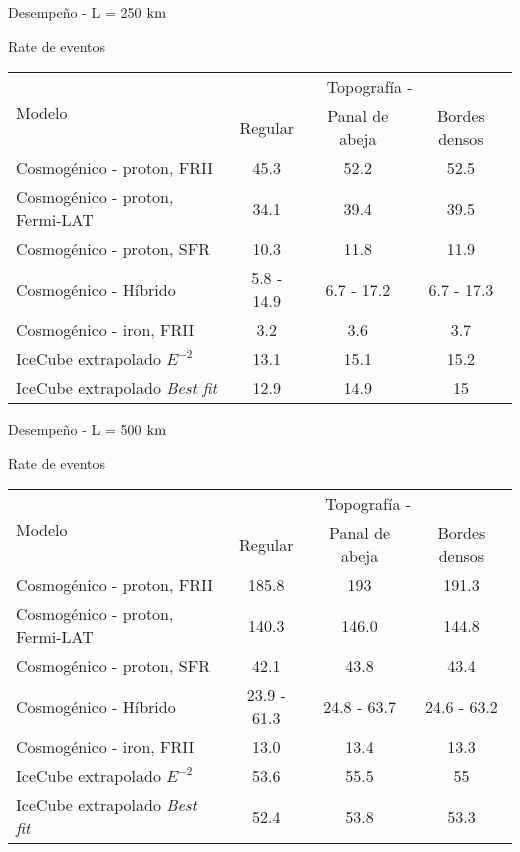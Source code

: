 \begin{frame}{Desempe\~no - L = 250 ${\rm km}$}
	\begin{block}{Rate de eventos}
		\begin{center}
		\renewcommand{\arraystretch}{1.3}
		\footnotesize
		\begin{tabular}{lccc}
			\hline
			\multirow{2}{*}{Modelo} & \multicolumn{3}{c}{Topograf\'ia - \cant{L=250}{km}} \\
			&   Regular &   Panal de abeja &   Bordes densos \\
			\hline
			Cosmogénico - proton, FRII &    45.3 &             52.2 &            52.5 \\
			Cosmogénico - proton, Fermi-LAT &     34.1 &             39.4 &            39.5 \\
			Cosmogénico - proton, SFR &     10.3 &             11.8 &            11.9 \\
			Cosmogénico - H\'ibrido &      5.8 - 14.9 &      6.7 - 17.2 &       6.7 - 17.3 \\
			Cosmogénico - iron, FRII &     3.2 &              3.6 &             3.7 \\
			IceCube extrapolado $E^{-2}$ &      13.1 &             15.1 &            15.2 \\
			IceCube extrapolado \emph{Best fit}  &      12.9 &             14.9 &            15   \\
			\hline
		\end{tabular}
		\end{center}
	\end{block}
\end{frame}

\begin{frame}{Desempe\~no - L = 500 ${\rm km}$}
	\begin{block}{Rate de eventos}
		\begin{center}
		\renewcommand{\arraystretch}{1.3}
		\footnotesize
		\begin{tabular}{lccc}
			\hline
			\multirow{2}{*}{Modelo} & \multicolumn{3}{c}{Topograf\'ia - \cant{L=500}{km}} \\
			&   Regular &   Panal de abeja &   Bordes densos \\
			\hline
			Cosmogénico - proton, FRII &    185.8 &            193   &           191.3 \\
			Cosmogénico - proton, Fermi-LAT &     140.3 &             146.0 &           144.8 \\
			Cosmogénico - proton, SFR &     42.1 &             43.8   &            43.4 \\
			Cosmogénico - H\'ibrido &  23.9 - 61.3 &   24.8 - 63.7 &  24.6 - 63.2 \\
			Cosmogénico - iron, FRII &     13.0   &        13.4 &            13.3 \\
			IceCube extrapolado $E^{-2}$ &      53.6 &         55.5   &            55   \\
			IceCube extrapolado \emph{Best fit} &    52.4 &  53.8  &   53.3 \\
			\hline
		\end{tabular}
		\end{center}
	\end{block}
\end{frame}


